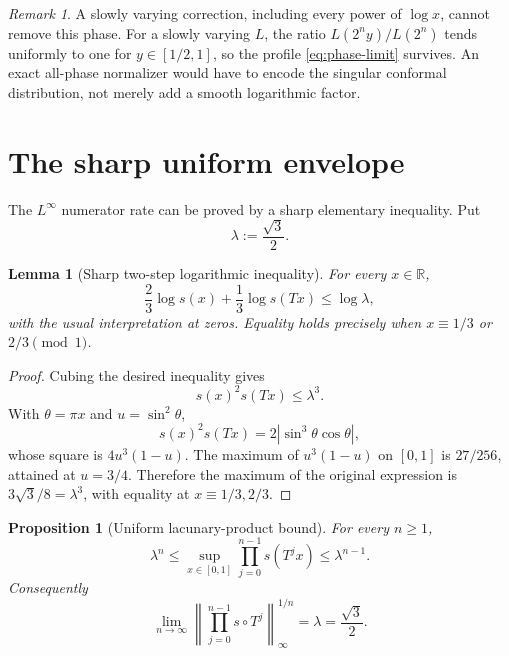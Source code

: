 \documentclass[11pt,oneside]{article}
\newtheorem{proposition}[theorem]{Proposition}
\newtheorem{lemma}[theorem]{Lemma}
\theoremstyle{definition}
\theoremstyle{remark}
\newtheorem{remark}[theorem]{Remark}
\newcommand{\R}{\mathbb R}
\newcommand{\abs}[1]{\left|#1\right|}
\newcommand{\norm}[1]{\left\lVert#1\right\rVert}
\begin{document}
\begin{remark}
A slowly varying correction, including every power of $\log x$, cannot remove this phase.
For a slowly varying $L$, the ratio $L(2^ny)/L(2^n)$ tends uniformly to one for
$y\in[1/2,1]$, so the profile \eqref{eq:phase-limit} survives.  An exact all-phase
normalizer would have to encode the singular conformal distribution, not merely add a
smooth logarithmic factor.
\end{remark}

\section{The sharp uniform envelope}
\label{sec:uniform}

The $L^\infty$ numerator rate can be proved by a sharp elementary inequality.  Put
\begin{equation}
 \lambda:=\frac{\sqrt3}{2}.
 \label{eq:lambda}
\end{equation}

\begin{lemma}[Sharp two-step logarithmic inequality]
\label{lem:sharp-sine-inequality}
For every $x\in\R$,
\begin{equation}
 \frac23\log s(x)+\frac13\log s(Tx)\le\log\lambda,
 \label{eq:weighted-log-inequality}
\end{equation}
with the usual interpretation at zeros.  Equality holds precisely when
$x\equiv1/3$ or $2/3\pmod1$.
\end{lemma}

\begin{proof}
Cubing the desired inequality gives
\[
 s(x)^2s(Tx)\le\lambda^3.
\]
With $\theta=\pi x$ and $u=\sin^2\theta$,
\[
 s(x)^2s(Tx)=2\abs{\sin^3\theta\cos\theta},
\]
whose square is $4u^3(1-u)$.  The maximum of $u^3(1-u)$ on $[0,1]$ is $27/256$, attained
at $u=3/4$.  Therefore the maximum of the original expression is
$3\sqrt3/8=\lambda^3$, with equality at $x\equiv1/3,2/3$.
\end{proof}

\begin{proposition}[Uniform lacunary-product bound]
\label{prop:Bn-uniform}
For every $n\ge1$,
\begin{equation}
 \lambda^n\le\sup_{x\in[0,1]}
 \prod_{j=0}^{n-1}s(T^jx)\le\lambda^{n-1}.
 \label{eq:Bn-uniform}
\end{equation}
Consequently
\begin{equation}
 \lim_{n\to\infty}\norm{\prod_{j=0}^{n-1}s\circ T^j}_{\infty}^{1/n}
 =\lambda=\frac{\sqrt3}{2}.
 \label{eq:Gelfond-rate}
\end{equation}
\end{proposition}
\end{document}
